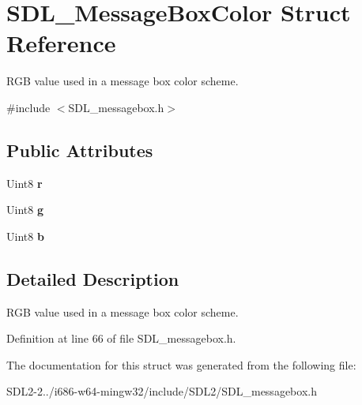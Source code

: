 \hypertarget{structSDL__MessageBoxColor}{\section{S\+D\+L\+\_\+\+Message\+Box\+Color Struct Reference}
\label{structSDL__MessageBoxColor}
}


R\+G\+B value used in a message box color scheme.  




{\ttfamily \#include $<$S\+D\+L\+\_\+messagebox.\+h$>$}

\subsection*{Public Attributes}
\begin{DoxyCompactItemize}
\item 
\hypertarget{structSDL__MessageBoxColor_a43ab2172c10058380fcf67ecc3f53184}{Uint8 {\bfseries r}}\label{structSDL__MessageBoxColor_a43ab2172c10058380fcf67ecc3f53184}

\item 
\hypertarget{structSDL__MessageBoxColor_a5820adab0b32aa3eade101ea36ed6b4a}{Uint8 {\bfseries g}}\label{structSDL__MessageBoxColor_a5820adab0b32aa3eade101ea36ed6b4a}

\item 
\hypertarget{structSDL__MessageBoxColor_ad1215a42167cb5b190ff8f19dbd42066}{Uint8 {\bfseries b}}\label{structSDL__MessageBoxColor_ad1215a42167cb5b190ff8f19dbd42066}

\end{DoxyCompactItemize}


\subsection{Detailed Description}
R\+G\+B value used in a message box color scheme. 

Definition at line 66 of file S\+D\+L\+\_\+messagebox.\+h.



The documentation for this struct was generated from the following file\+:\begin{DoxyCompactItemize}
\item 
S\+D\+L2-\/2../i686-\/w64-\/mingw32/include/\+S\+D\+L2/S\+D\+L\+\_\+messagebox.\+h\end{DoxyCompactItemize}
